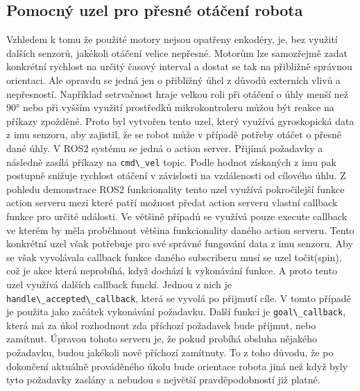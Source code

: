 \subsection{Pomocný uzel pro přesné otáčení robota}
Vzhledem k tomu že použité motory nejsou opatřeny enkodéry, je, bez využití dalších senzorů, jakékoli otáčení velice nepřesné. Motorům lze samozřejmě zadat konkrétní rychlost na určitý časový interval a dostat se tak na přibližně správnou orientaci. Ale opravdu se jedná jen o přibližný úhel z důvodů externích vlivů a nepřesností. Například setrvačnost hraje velkou roli při otáčení o úhly menší než 90° nebo při vyšším využití prostředků mikrokontroleru můžou být reakce na příkazy zpožděné.
Proto byl vytvořen tento uzel, který využívá gyroskopická data z imu senzoru, aby zajistil, že se robot  může v případě potřeby otáčet o přesně dané úhly. V ROS2 systému se jedná o action server. Přijímá požadavky a následně zasílá příkazy na \verb|cmd\_vel| topic. Podle hodnot získaných z imu pak postupně snižuje rychlost otáčení v závislosti na vzdálenosti od cílového úhlu. Z pohledu demonstrace ROS2 funkcionality tento uzel využívá pokročilejší funkce action serveru mezi které patří možnost předat action serveru vlastní callback funkce pro určité události. Ve většině případů se využívá pouze execute callback ve kterém by měla proběhnout většina funkcionality daného action serveru. Tento konkrétní uzel však potřebuje pro své správné fungování data z imu senzoru. Aby se však vyvolávala callback funkce daného subscriberu musí se uzel točit(spin), což je akce která neprobíhá, když dochází k vykonávání funkce. A proto tento uzel využívá dalších callback funckí. Jednou z nich je \verb|handle\_accepted\_callback|, která se vyvolá po přijmutí cíle. V tomto případě je použita jako začátek vykonávání požadavku. Další funkcí je \verb|goal\_callback|, která má za úkol rozhodnout zda příchozí požadavek bude příjmut, nebo zamítnut. Úpravou tohoto serveru je, že pokud probíhá obsluha nějakého požadavku, budou jakékoli nově příchozí zamítnuty. To z toho důvodu, že po dokončení aktuálně prováděného úkolu bude orientace robota jiná než když byly tyto požadavky zaslány a nebudou s největší pravděpodobností již platné.


